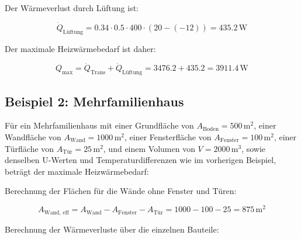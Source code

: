 Der Wärmeverlust durch Lüftung ist:

\begin{equation}
\dot{Q}_\text{Lüftung} = 0.34 \cdot 0.5 \cdot 400 \cdot (20 - (-12)) = 435.2 \, \text{W}
\end{equation}

Der maximale Heizwärmebedarf ist daher:

\begin{equation}
Q_\text{max} = \dot{Q}_\text{Trans} + \dot{Q}_\text{Lüftung} = 3476.2 + 435.2 = 3911.4 \, \text{W}
\end{equation}

\subsection{Beispiel 2: Mehrfamilienhaus}

Für ein Mehrfamilienhaus mit einer Grundfläche von \(A_\text{Boden} = 500 \, \text{m}^2\), einer Wandfläche von \(A_\text{Wand} = 1000 \, \text{m}^2\), einer Fensterfläche von \(A_\text{Fenster} = 100 \, \text{m}^2\), einer Türfläche von \(A_\text{Tür} = 25 \, \text{m}^2\), und einem Volumen von \(V = 2000 \, \text{m}^3\), sowie denselben U-Werten und Temperaturdifferenzen wie im vorherigen Beispiel, beträgt der maximale Heizwärmebedarf:

Berechnung der Flächen für die Wände ohne Fenster und Türen:

\begin{equation}
A_\text{Wand, eff} = A_\text{Wand} - A_\text{Fenster} - A_\text{Tür} = 1000 - 100 - 25 = 875 \, \text{m}^2
\end{equation}

Berechnung der Wärmeverluste über die einzelnen Bauteile:

